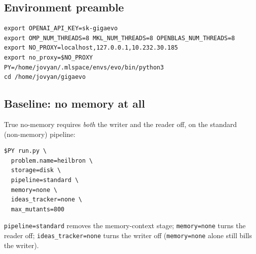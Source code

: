 \documentclass[11pt]{article}
\newcommand{\code}[1]{\texttt{#1}}
\begin{document}
\subsection{Environment preamble}
\begin{lstlisting}
export OPENAI_API_KEY=sk-gigaevo
export OMP_NUM_THREADS=8 MKL_NUM_THREADS=8 OPENBLAS_NUM_THREADS=8
export NO_PROXY=localhost,127.0.0.1,10.232.30.185
export no_proxy=$NO_PROXY
PY=/home/jovyan/.mlspace/envs/evo/bin/python3
cd /home/jovyan/gigaevo
\end{lstlisting}

\subsection{Baseline: no memory at all}
True no-memory requires \emph{both} the writer and the reader off, on the standard
(non-memory) pipeline:
\begin{lstlisting}
$PY run.py \
  problem.name=heilbron \
  storage=disk \
  pipeline=standard \
  memory=none \
  ideas_tracker=none \
  max_mutants=800
\end{lstlisting}
\code{pipeline=standard} removes the memory-context stage; \code{memory=none}
turns the reader off; \code{ideas\_tracker=none} turns the writer off (\code{memory=none}
alone still bills the writer).
\end{document}
